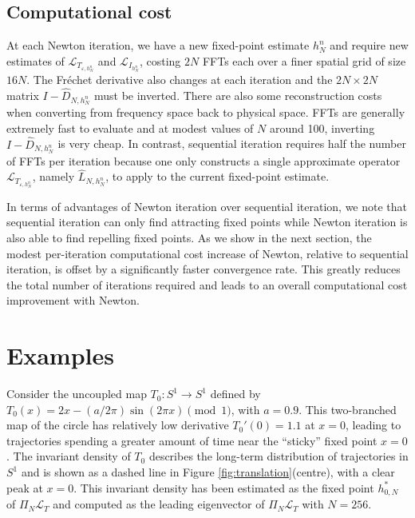 \documentclass[12pt]{article}
\def\L{\mathcal{L}}
\newcommand{\eps}{\varepsilon}
\theoremstyle{plain}
\begin{document}
{\subsection{Computational cost}
At each Newton iteration, we have a new fixed-point estimate $h^n_N$ and require new estimates of $\L_{T_{\eps,h^n_N}}$ and $\L_{I_{h^n_N}}$, costing $2N$ FFTs each over a finer spatial grid of size $16N$.
The Fr\'echet derivative also changes at each iteration and the $2N\times 2N$ matrix $I-\hat D_{N,h^n_N}$ must be inverted.
There are also some reconstruction costs when converting from frequency space back to physical space.
FFTs are generally extremely fast to evaluate and at modest values of $N$ around 100, inverting $I-\hat D_{N,h^n_N}$ is very cheap.
In contrast, sequential iteration requires half the number of FFTs per iteration because one only constructs a single approximate operator $\L_{T_{\eps,h^n_N}}$, namely $\hat L_{N,h^n_N}$, to apply to the current fixed-point estimate.

In terms of advantages of Newton iteration over sequential iteration, we note that sequential iteration can only find attracting fixed points while Newton iteration is also able to find repelling fixed points.
As we show in the next section, the modest per-iteration computational cost increase of Newton,  relative to sequential iteration, is offset by a significantly faster convergence rate.
This greatly reduces the total number of iterations required and leads to an overall computational cost improvement with Newton.


 



\section{Examples}
\label{sec:examples}

Consider the uncoupled map $T_0:S^1\to S^1$ defined by $T_0(x)=2x-(a/2\pi)\sin(2\pi x)\pmod 1$, with $a=0.9$.
This two-branched map of the circle has relatively low derivative $T_0'(0)=1.1$ at $x=0$, leading to trajectories spending a greater amount of time near the ``sticky'' fixed point $x=0$.
The invariant density of $T_0$ describes the long-term distribution of trajectories in $S^1$ and is shown as a dashed line in Figure \ref{fig:translation}(centre), with a clear peak at $x=0$.
This invariant density has been estimated as the fixed point $h_{0,N}^*$ of $\Pi_N\mathcal{L}_{T}$ and computed as the leading eigenvector of $\Pi_N\mathcal{L}_T$ with $N=256$.


}
\end{document}
